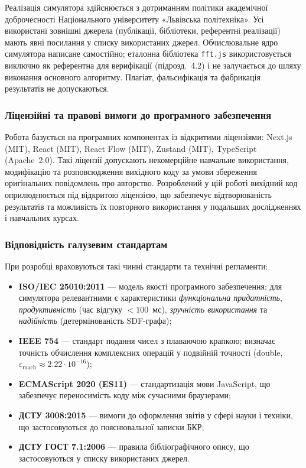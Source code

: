 Реалізація симулятора здійснюється з дотриманням політики
академічної доброчесності Національного університету «Львівська
політехніка». Усі використані зовнішні джерела (публікації,
бібліотеки, референтні реалізації) мають явні посилання у списку
використаних джерел. Обчислювальне ядро симулятора написане
самостійно; еталонна бібліотека \texttt{fft.js} використовується
виключно як референтна для верифікації (підрозд.~4.2) і не
залучається до шляху виконання основного алгоритму. Плагіат,
фальсифікація та фабрикація результатів не допускаються.

\subsubsection*{Ліцензійні та правові вимоги до програмного забезпечення}

Робота базується на програмних компонентах із відкритими ліцензіями:
Next.js (MIT), React (MIT), React Flow (MIT), Zustand (MIT),
TypeScript (Apache~2.0). Такі ліцензії допускають некомерційне
навчальне використання, модифікацію та розповсюдження вихідного
коду за умови збереження оригінальних повідомлень про авторство.
Розроблений у цій роботі вихідний код оприлюднюється під відкритою
ліцензією, що забезпечує відтворюваність результатів та можливість
їх повторного використання у подальших дослідженнях і навчальних
курсах.

\subsubsection*{Відповідність галузевим стандартам}

При розробці враховуються такі чинні стандарти та технічні
регламенти:

\begin{itemize}
  \item \textbf{ISO/IEC 25010:2011} --- модель якості програмного
        забезпечення; для симулятора релевантними є характеристики
        \textit{функціональна придатність}, \textit{продуктивність}
        (час відгуку $<100$~мс), \textit{зручність використання}
        та \textit{надійність} (детермінованість SDF-графа);
  \item \textbf{IEEE 754} --- стандарт подання чисел з плаваючою
        крапкою; визначає точність обчислення комплексних операцій
        у подвійній точності (double, $\varepsilon_{\mathrm{mach}}
        \approx 2.22 \cdot 10^{-16}$);
  \item \textbf{ECMAScript 2020 (ES11)} --- стандартизація мови
        JavaScript, що забезпечує переносимість коду між сучасними
        браузерами;
  \item \textbf{ДСТУ 3008:2015} --- вимоги до оформлення звітів у
        сфері науки і техніки, що застосовуються до пояснювальної
        записки БКР;
  \item \textbf{ДСТУ ГОСТ 7.1:2006} --- правила бібліографічного
        опису, що застосовуються у списку використаних джерел.
\end{itemize}

